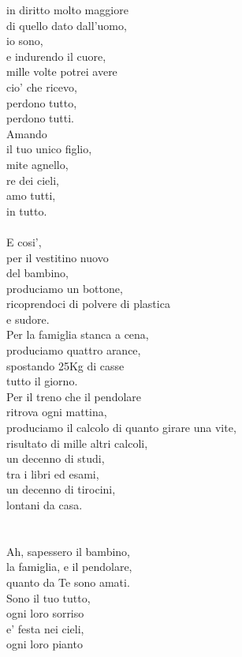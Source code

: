 \begin{haiku}
in diritto molto maggiore\\
di quello dato dall'uomo,\\
io sono,\\
e indurendo il cuore,\\
mille volte potrei avere\\
cio' che ricevo,\\
perdono tutto,\\
perdono tutti.\\
Amando \\
il tuo unico figlio,\\
mite agnello,\\
re dei cieli,\\
amo tutti,\\
in tutto.\\
\leavevmode\\
E cosi',\\
per il vestitino nuovo\\
del bambino,\\
produciamo un bottone,\\
ricoprendoci di polvere di plastica\\
e sudore.\\
Per la famiglia stanca a cena,\\
produciamo quattro arance,\\
spostando 25Kg di casse\\
tutto il giorno.\\
Per il treno che il pendolare \\
ritrova ogni mattina,\\
produciamo il calcolo di quanto girare una vite,\\
risultato di mille altri calcoli,\\
un decenno di studi, \\
tra i libri ed esami,\\
un decenno di tirocini,\\
lontani da casa.\\
\leavevmode\\
\leavevmode\\
Ah, sapessero il bambino,\\
la famiglia, e il pendolare,\\
quanto da Te sono amati.\\
Sono il tuo tutto,\\
ogni loro sorriso\\
e' festa nei cieli,\\
ogni loro pianto\\

\end{haiku}
